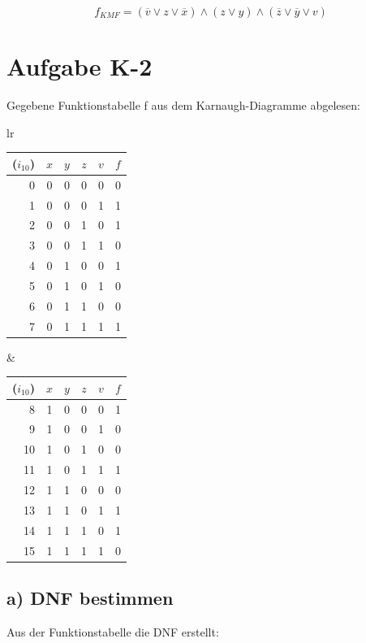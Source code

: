 \documentclass[11pt]{scrartcl}
\begin{document}
\[f_{KMF} = (\overline{v} \lor z \lor \overline{x}) \land
 (z \lor y) \land (\overline{z} \lor \overline{y} \lor v) \]



\newpage
\section{Aufgabe K-2}

Gegebene Funktionstabelle f aus dem Karnaugh-Diagramme abgelesen:\\

\begin{center}
\begin{tabular}{lr}
    \begin{tabular}[t]{r|cccc|c}
        ($i_{10}$)&$x$&$y$&$z$&$v$&$f$\\
        \hline
        0&0&0&0&0&0\\
        1&0&0&0&1&1\\
        2&0&0&1&0&1\\
        3&0&0&1&1&0\\
        4&0&1&0&0&1\\
        5&0&1&0&1&0\\
        6&0&1&1&0&0\\
        7&0&1&1&1&1\\
    \end{tabular}
  &
    \begin{tabular}[t]{r|cccc|c}
      ($i_{10}$)&$x$&$y$&$z$&$v$&$f$\\
        \hline
        8&1&0&0&0&1\\
        9&1&0&0&1&0\\
        10&1&0&1&0&0\\
        11&1&0&1&1&1\\
        12&1&1&0&0&0\\
        13&1&1&0&1&1\\
        14&1&1&1&0&1\\
        15&1&1&1&1&0\\
    \end{tabular}
\end{tabular}
\end{center}

\subsection{a) DNF bestimmen}
\noindent Aus der Funktionstabelle die DNF erstellt:
\end{document}
